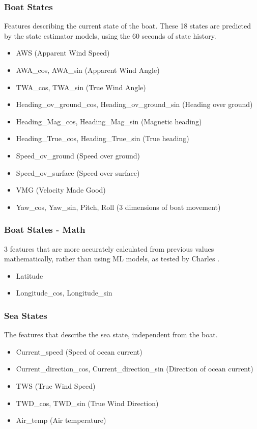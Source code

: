 \subsubsection{Boat States}
Features describing the current state of the boat. These 18 states are predicted by the state estimator models, using the 60 seconds of state history.

\begin{itemize}
    \item AWS (Apparent Wind Speed)
    \item AWA\_cos, AWA\_sin (Apparent Wind Angle)
    \item TWA\_cos, TWA\_sin (True Wind Angle)
    \item Heading\_ov\_ground\_cos, Heading\_ov\_ground\_sin (Heading over ground)
    \item Heading\_Mag\_cos, Heading\_Mag\_sin (Magnetic heading)
    \item Heading\_True\_cos, Heading\_True\_sin (True heading)
    \item Speed\_ov\_ground (Speed over ground)
    \item Speed\_ov\_surface (Speed over surface)
    \item VMG (Velocity Made Good)
    \item Yaw\_cos, Yaw\_sin, Pitch, Roll (3 dimensions of boat movement)
\end{itemize}


\bigskip
\subsubsection{Boat States - Math}
3 features that are more accurately calculated from previous values mathematically, rather than using ML models, as tested by Charles \cite{charles}.

\begin{itemize}
    \item Latitude
    \item Longitude\_cos, Longitude\_sin
\end{itemize}


\clearpage
\subsubsection{Sea States}
The features that describe the sea state, independent from the boat.

\begin{itemize}
    \item Current\_speed (Speed of ocean current)
    \item Current\_direction\_cos, Current\_direction\_sin (Direction of ocean current)
    \item TWS (True Wind Speed)
    \item TWD\_cos, TWD\_sin (True Wind Direction)
    \item Air\_temp (Air temperature)
\end{itemize}
